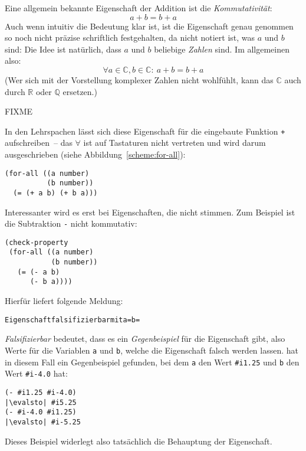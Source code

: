 Eine allgemein bekannte Eigenschaft der Addition ist die
\textit{Kommutativität}:
%
\begin{displaymath}
a + b = b + a
\end{displaymath}
%
Auch wenn intuitiv die Bedeutung klar ist, ist  die Eigenschaft genau
genommen so noch nicht präzise schriftlich festgehalten, da nicht
notiert ist, was $a$ und $b$ sind: Die Idee ist natürlich,
dass $a$ und $b$ beliebige \emph{Zahlen} sind.  Im allgemeinen also:
%
\begin{displaymath}
\forall a \in \mathbb{C}, b \in \mathbb{C}:\ a + b = b + a 
\end{displaymath}
%
(Wer sich mit der Vorstellung komplexer Zahlen nicht wohlfühlt, kann
das $\mathbb{C}$ auch durch $\mathbb{R}$ oder $\mathbb{Q}$ ersetzen.)

FIXME

In den Lehrspachen lässt sich diese Eigenschaft für die eingebaute Funktion
\lstinline{+} aufschreiben~-- das $\forall$ ist auf
Tastaturen nicht vertreten und wird darum ausgeschrieben (siehe
Abbildung~\ref{scheme:for-all}):
%
\begin{lstlisting}
(for-all ((a number)
          (b number))
  (= (+ a b) (+ b a)))
\end{lstlisting}
%

Interessanter wird es erst bei Eigenschaften, die nicht stimmen.  Zum
Beispiel ist die Subtraktion \lstinline{-} nicht kommutativ:
%
\begin{lstlisting}
(check-property
 (for-all ((a number)
           (b number))
   (= (- a b)
      (- b a))))
\end{lstlisting}
%
Hierfür liefert \drscheme{} folgende Meldung:
%
\begin{alltt}
        Eigenschaft falsifizierbar mit a =  b = 
\end{alltt}
%
\textit{Falsifizierbar} bedeutet, dass es ein
\textit{Gegenbeispiel} für die Eigenschaft gibt,
also Werte für die Variablen \lstinline{a} und \lstinline{b}, welche die
Eigenschaft falsch werden lassen.  \drscheme{} hat in diesem Fall ein
Gegenbeispiel gefunden, bei dem \lstinline{a} den Wert \verb|#i1.25| und
\lstinline{b} den Wert \verb|#i-4.0| hat:
%
\begin{lstlisting}
(- #i1.25 #i-4.0)
|\evalsto| #i5.25
(- #i-4.0 #i1.25)
|\evalsto| #i-5.25
\end{lstlisting}
%
Dieses Beispiel widerlegt also tatsächlich die Behauptung der Eigenschaft.


